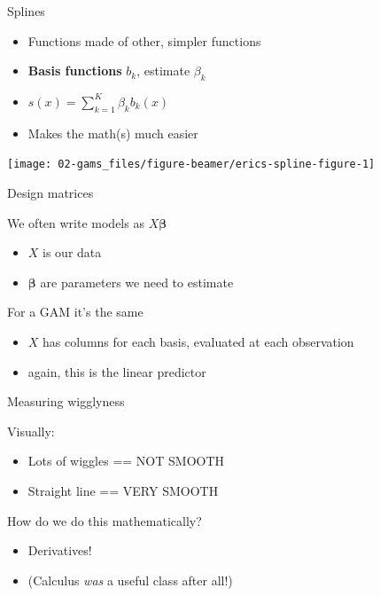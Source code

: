 \documentclass[10pt,ignorenonframetext,compress, aspectratio=169]{beamer}
\providecommand{\tightlist}{%
  \setlength{\itemsep}{0pt}\setlength{\parskip}{0pt}}
\begin{document}
\begin{frame}{Splines}

\begin{itemize}
\tightlist
\item
  Functions made of other, simpler functions
\item
  \textbf{Basis functions} \(b_k\), estimate \(\beta_k\)
\item
  \(s(x) = \sum_{k=1}^K \beta_k b_k(x)\)
\item
  Makes the math(s) much easier
\end{itemize}

\begin{center}\texttt{[image: 02-gams\_files/figure-beamer/erics-spline-figure-1]} \end{center}

\end{frame}

\begin{frame}{Design matrices}

We often write models as \(X\boldsymbol{\beta}\)

\begin{itemize}
\tightlist
\item
  \(X\) is our data
\item
  \(\boldsymbol{\beta}\) are parameters we need to estimate
\end{itemize}

For a GAM it's the same

\begin{itemize}
\tightlist
\item
  \(X\) has columns for each basis, evaluated at each observation
\item
  again, this is the linear predictor
\end{itemize}

\end{frame}

\begin{frame}{Measuring wigglyness}

Visually:

\begin{itemize}
\tightlist
\item
  Lots of wiggles == NOT SMOOTH
\item
  Straight line == VERY SMOOTH
\end{itemize}

How do we do this mathematically?

\begin{itemize}
\tightlist
\item
  Derivatives!
\item
  (Calculus \emph{was} a useful class after all!)
\end{itemize}

\end{frame}
\end{document}
